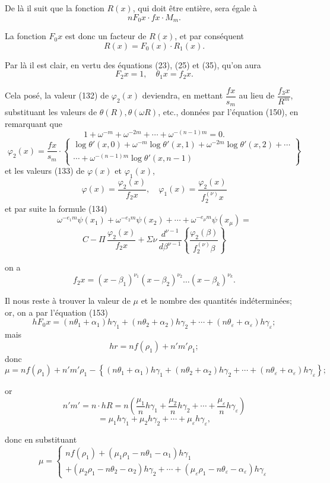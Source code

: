 \documentclass{article}
\begin{document}
De là il suit que la fonction $R(x)$, qui doit être entière, sera égale à
\[ n F_0 x \cdot f x \cdot M_m. \]

La fonction $F_0 x$ est donc un facteur de $R(x)$, et par conséquent
\[ R(x) = F_0(x) \cdot R_1(x). \tag{159} \]

Par là il est clair, en vertu des équations (23), (25) et (35), qu'on aura
\[ F_2 x = 1, \quad \theta_1 x = f_2 x. \tag{160} \]

Cela posé, la valeur (132) de $\varphi_2(x)$ deviendra, en mettant $\dfrac{f x}{s_m}$ au lieu de $\dfrac{f_3 x}{R^{m}}$, substituant les valeurs de $\theta(R), \theta(\omega R)$, etc., données par l'équation (150), en remarquant que
\[ 1+\omega^{-m}+\omega^{-2m}+\cdots+\omega^{-(n-1)m} = 0. \]
\[ \varphi_2(x) = \frac{f x}{s_m} \cdot \left\{ \begin{array}{l} \log\theta'(x,0)+\omega^{-m}\log\theta'(x,1)+\omega^{-2m}\log\theta'(x,2)+\cdots \\ \cdots+\omega^{-(n-1)m}\log\theta'(x,n-1) \end{array} \right\} \tag{161} \]
et les valeurs (133) de $\varphi(x)$ et $\varphi_1(x)$,
\[ \varphi(x) = \frac{\varphi_2(x)}{f_2 x}, \quad \varphi_1(x) = \frac{\varphi_2(x)}{f_2^{(\nu)}x} \]
et par suite la formule (134)
\[ \omega^{-e_1 m}\psi(x_1)+\omega^{-e_2 m}\psi(x_2)+\cdots+\omega^{-e_\mu m}\psi(x_\mu) = \]
\[ C - \Pi\,\frac{\varphi_2(x)}{f_2 x} + \Sigma\nu\,\frac{d^{\nu-1}}{d\beta^{\nu-1}} \left\{ \frac{\varphi_2(\beta)}{f_2^{(\nu)}\beta} \right\} \tag{162} \]

on a
\[ f_2 x = (x-\beta_1)^{\nu_1}(x-\beta_2)^{\nu_2} \ldots (x-\beta_k)^{\nu_k}. \]

Il nous reste à trouver la valeur de $\mu$ et le nombre des quantités indéterminées; or, on a par l'équation (153)
\[ hF_0 x = (n\theta_1+\alpha_1)h\gamma_1+(n\theta_2+\alpha_2)h\gamma_2+\cdots+(n\theta_\varepsilon+\alpha_\varepsilon)h\gamma_\varepsilon; \tag{163} \]
mais
\[ hr = nf(\rho_1) + n'm'\rho_1; \]
donc
\[ \mu = nf(\rho_1)+n'm'\rho_1-\left\{(n\theta_1+\alpha_1)h\gamma_1+(n\theta_2+\alpha_2)h\gamma_2+\cdots+(n\theta_\varepsilon+\alpha_\varepsilon)h\gamma_\varepsilon\right\}; \]

or
\[ n'm' = n \cdot hR = n\left(\frac{\mu_1}{n}h\gamma_1+\frac{\mu_2}{n}h\gamma_2+\cdots+\frac{\mu_\varepsilon}{n}h\gamma_\varepsilon\right) \]
\[ = \mu_1 h\gamma_1+\mu_2 h\gamma_2+\cdots+\mu_\varepsilon h\gamma_\varepsilon, \]

donc en substituant
\[ \mu = \begin{cases} nf(\rho_1)+(\mu_1\rho_1-n\theta_1-\alpha_1)h\gamma_1 \\ +(\mu_2\rho_1-n\theta_2-\alpha_2)h\gamma_2+\cdots+(\mu_\varepsilon\rho_1-n\theta_\varepsilon-\alpha_\varepsilon)h\gamma_\varepsilon \end{cases} \tag{164} \]
\end{document}
